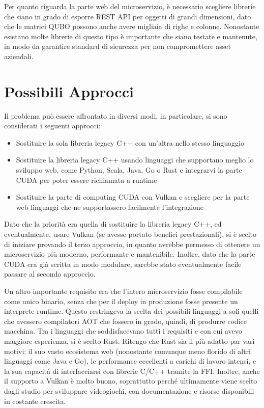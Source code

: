 Per quanto riguarda la parte web del microservizio, è necessario scegliere librerie che siano in grado di esporre REST API per oggetti di grandi dimensioni, dato che le matrici QUBO possono anche avere migliaia di righe e colonne. Nonostante esistano molte librerie di questo tipo è importante che siano testate e mantenute, in modo da garantire standard di sicurezza per non compromettere asset aziendali.


\section{Possibili Approcci}

Il problema può essere affrontato in diversi modi, in particolare, si sono considerati i seguenti approcci:

\begin{itemize}
    \item Sostituire la sola libreria legacy C++ con un'altra nello stesso linguaggio
    \item Sostituire la libreria legacy C++ usando linguaggi che supportano meglio lo sviluppo web, come Python, Scala, Java, Go o Rust e integrarvi la parte CUDA per poter essere richiamata a runtime
    \item Sostituire la parte di computing CUDA con Vulkan e scegliere per la parte web linguaggi che ne supportassero facilmente l'integrazione 
\end{itemize}

Dato che la priorità era quella di sostituire la libreria legacy C++, ed eventualmente, usare Vulkan (se avesse portato benefici prestazionali), si è scelto di iniziare provando il terzo approccio, in quanto avrebbe permesso di ottenere un microservizio più moderno, performante e mantenibile. Inoltre, dato che la parte CUDA era già scritta in modo modulare, sarebbe stato eventualmente facile passare al secondo approccio. 

Un altro importante requisito era che l'intero microservizio fosse compilabile come unico binario, senza che per il deploy in produzione fosse presente un interprete runtime. Questo restringeva la scelta dei possibili linguaggi a soli quelli che avessero compilatori \gls{AOT} che fossero in grado, quindi, di produrre codice macchina. Tra i linguaggi che soddisfacevano tutti i requisiti e con cui avevo maggiore esperienza, si è scelto Rust. Ritengo che Rust sia il più adatto par vari motivi: il suo vasto ecosistema web (nonostante comunque meno florido di altri linguaggi come Java e Go), le performance eccellenti a carichi di lavoro intensi, e la sua capacità di interfacciarsi con librerie C/C++ tramite la FFI. Inoltre, anche il supporto a Vulkan è molto buono, soprattutto perché ultimamente viene scelto dagli studio per sviluppare videogiochi, con documentazione e risorse disponibili in costante crescita.

